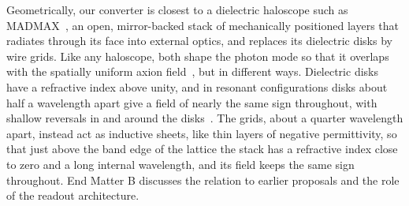 \documentclass[
  aps,prl,reprint,superscriptaddress,
  amsmath,amssymb,floatfix,nofootinbib
]{revtex4-2}
\begin{document}
Geometrically, our converter is closest to a dielectric haloscope such as MADMAX~\cite{Caldwell:2016dcw,MADMAX:2019pub}, an open, mirror-backed stack of mechanically positioned layers that radiates through its face into external optics, and replaces its dielectric disks by wire grids. Like any haloscope, both shape the photon mode so that it overlaps with the spatially uniform axion field~\cite{Ioannisian:2017srr,Egge:2023cos}, but in different ways. Dielectric disks have a refractive index above unity, and in resonant configurations disks about half a wavelength apart give a field of nearly the same sign throughout, with shallow reversals in and around the disks~\cite{Millar:2016cjp}. The grids, about a quarter wavelength apart, instead act as inductive sheets, like thin layers of negative permittivity, so that just above the band edge of the lattice the stack has a refractive index close to zero and a long internal wavelength, and its field keeps the same sign throughout. End Matter B discusses the relation to earlier proposals and the role of the readout architecture.
\end{document}
